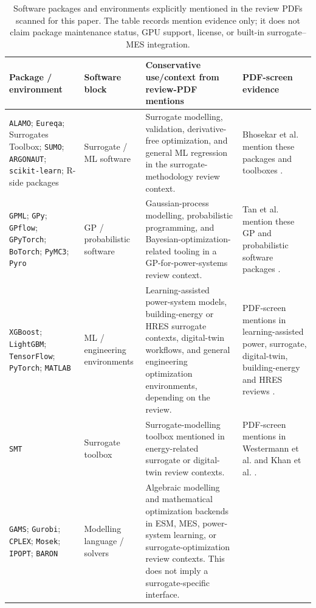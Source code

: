 \documentclass[final,5p,times,twocolumn]{elsarticle}
\begin{document}
\begin{table}[!t]
\centering
\scriptsize
\caption{Software packages and environments explicitly mentioned in the review PDFs scanned for this paper. The table records mention evidence only; it does not claim package maintenance status, GPU support, license, or built-in surrogate--MES integration.}
\label{tab:T8-software-packages}
\renewcommand{\arraystretch}{1.10}
\begin{tabularx}{\textwidth}{@{}L{0.20\textwidth} L{0.18\textwidth} L{0.34\textwidth} L{0.20\textwidth}@{}}
\toprule
Package / environment & Software block & Conservative use/context from review-PDF mentions & PDF-screen evidence \\
\midrule
\texttt{ALAMO}; \texttt{Eureqa}; Surrogates Toolbox; \texttt{SUMO}; \texttt{ARGONAUT}; \texttt{scikit-learn}; R-side packages &
Surrogate / ML software &
Surrogate modelling, validation, derivative-free optimization, and general ML regression in the surrogate-methodology review context. &
Bhosekar et al. mention these packages and toolboxes \cite{Bhosekar2018}. \\
\texttt{GPML}; \texttt{GPy}; \texttt{GPflow}; \texttt{GPyTorch}; \texttt{BoTorch}; \texttt{PyMC3}; \texttt{Pyro} &
GP / probabilistic software &
Gaussian-process modelling, probabilistic programming, and Bayesian-optimization-related tooling in a GP-for-power-systems review context. &
Tan et al. mention these GP and probabilistic software packages \cite{Tan2026}. \\
\texttt{XGBoost}; \texttt{LightGBM}; \texttt{TensorFlow}; \texttt{PyTorch}; \texttt{MATLAB} &
ML / engineering environments &
Learning-assisted power-system models, building-energy or HRES surrogate contexts, digital-twin workflows, and general engineering optimization environments, depending on the review. &
PDF-screen mentions in learning-assisted power, surrogate, digital-twin, building-energy and HRES reviews \cite{Khaloie2025,Conti2026,Zhang2026_building,Lim2025,Elwy2024,Tan2026,FernandezGodino2023,Westermann2019,Li2025_hydrogen,Etghani2025}. \\
\texttt{SMT} &
Surrogate toolbox &
Surrogate-modelling toolbox mentioned in energy-related surrogate or digital-twin review contexts. &
PDF-screen mentions in Westermann et al. and Khan et al. \cite{Westermann2019,Khan2024_DT}. \\
\texttt{GAMS}; \texttt{Gurobi}; \texttt{CPLEX}; \texttt{Mosek}; \texttt{IPOPT}; \texttt{BARON} &
Modelling language / solvers &
Algebraic modelling and mathematical optimization backends in ESM, MES, power-system learning, or surrogate-optimization review contexts. This does not imply a surrogate-specific interface. &

\end{tabularx}
\end{table}
\end{document}
